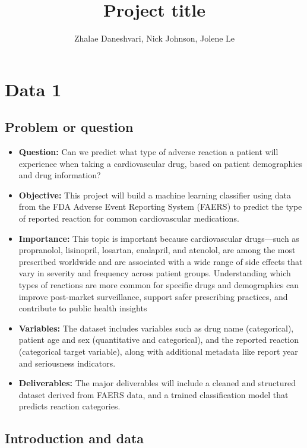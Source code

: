 \documentclass[
  letterpaper,
  DIV=11,
  numbers=noendperiod]{scrartcl}
\title{Project title}
\author{Zhalae Daneshvari, Nick Johnson, Jolene Le}
\date{}
\begin{document}
\maketitle


\section{Data 1}\label{data-1}

\subsection{Problem or question}\label{problem-or-question}

\begin{itemize}
\item
  \textbf{Question:} Can we predict what type of adverse reaction a
  patient will experience when taking a cardiovascular drug, based on
  patient demographics and drug information?
\item
  \textbf{Objective:} This project will build a machine learning
  classifier using data from the FDA Adverse Event Reporting System
  (FAERS) to predict the type of reported reaction for common
  cardiovascular medications.
\item
  \textbf{Importance:} This topic is important because cardiovascular
  drugs---such as propranolol, lisinopril, losartan, enalapril, and
  atenolol, are among the most prescribed worldwide and are associated
  with a wide range of side effects that vary in severity and frequency
  across patient groups. Understanding which types of reactions are more
  common for specific drugs and demographics can improve post-market
  surveillance, support safer prescribing practices, and contribute to
  public health insights
\item
  \textbf{Variables:} The dataset includes variables such as drug name
  (categorical), patient age and sex (quantitative and categorical), and
  the reported reaction (categorical target variable), along with
  additional metadata like report year and seriousness indicators.
\item
  \textbf{Deliverables:} The major deliverables will include a cleaned
  and structured dataset derived from FAERS data, and a trained
  classification model that predicts reaction categories.
\end{itemize}

\subsection{Introduction and data}\label{introduction-and-data}
\end{document}
